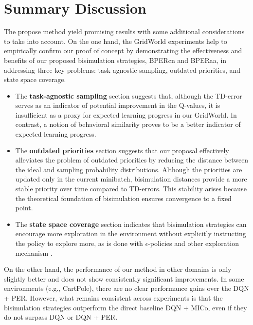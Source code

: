\section{Summary Discussion}

The propose method yield promising results with some additional considerations to take into account. On the one hand, the GridWorld experiments help to empirically confirm our proof of concept by demonstrating the effectiveness and benefits of our proposed bisimulation strategies, BPERcn and BPERaa, in addressing three key problems: task-agnostic sampling, outdated priorities, and state space coverage.

\begin{itemize}
    \item The \textbf{task-agnostic sampling} section suggests that, although the TD-error serves as an indicator of potential improvement in the Q-values, it is insufficient as a proxy for expected learning progress in our GridWorld. In contrast, a notion of behavioral similarity proves to be a better indicator of expected learning progress.
    \item The \textbf{outdated priorities} section suggests that our proposal effectively alleviates the problem of outdated priorities by reducing the distance between the ideal and sampling probability distributions. Although the priorities are updated only in the current minibatch, bisimulation distances provide a more stable priority over time compared to TD-errors. This stability arises because the theoretical foundation of bisimulation ensures convergence to a fixed point.
    \item The \textbf{state space coverage} section indicates that bisimulation strategies can encourage more exploration in the environment without explicitly instructing the policy to explore more, as is done with $\epsilon$-policies and other exploration mechanism \cite{amin2021survey,ladosz2022exploration}.    
\end{itemize}

On the other hand, the performance of our method in other domains is only slightly better and does not show consistently significant improvements. In some environments (e.g., CartPole), there are no clear performance gains over the DQN + PER. However, what remains consistent across experiments is that the bisimulation strategies outperform the direct baseline DQN + MICo, even if they do not surpass DQN or DQN + PER.

